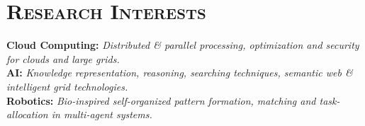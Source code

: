 \documentclass[notopicbreak,contbibnum,plain]{simplecv}
\begin{document}
\section{\textsc{Research Interests}}
\begin{topic}
\normalsize
\vspace*{-0.3cm}
\item \textbf{Cloud Computing:} \textit{Distributed \& parallel processing, optimization and security for clouds and large grids.}\\
\textbf{AI:} \textit{Knowledge representation, reasoning, searching techniques, semantic web \& intelligent grid technologies.}\\
\textbf{Robotics:} \textit{Bio-inspired self-organized pattern formation, matching and task-allocation in multi-agent systems.}
%
\vspace*{-0.25cm}
\end{topic}
\end{document}
